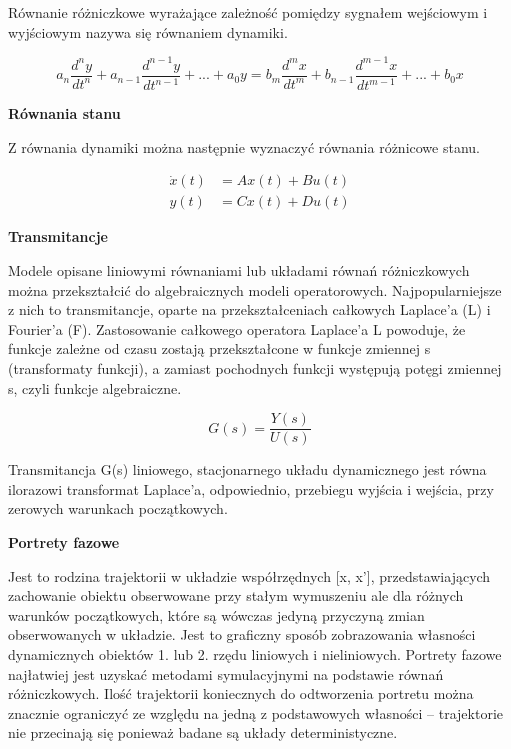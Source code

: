 Równanie różniczkowe wyrażające zależność pomiędzy sygnałem wejściowym i wyjściowym nazywa się równaniem dynamiki.

\begin{equation}
    a_n\frac{d^ny}{dt^n} + a_{n-1}\frac{d^{n-1}y}{dt^{n-1}} + ... + a_0y = b_m\frac{d^mx}{dt^m} + b_{n-1}\frac{d^{m-1}x}{dt^{m-1}} + ... + b_0x
\end{equation}

\textbf{Równania stanu}

Z równania dynamiki można następnie wyznaczyć równania różnicowe stanu.

\begin{equation}
    \begin{split}
    \dot{x}(t) &= Ax(t)+Bu(t)  \\
    y(t) &= Cx(t) + Du(t)
    \end{split}
\end{equation}


\textbf{Transmitancje}

Modele opisane liniowymi równaniami lub układami równań różniczkowych można przekształcić do algebraicznych modeli operatorowych. Najpopularniejsze z nich to transmitancje, oparte na przekształceniach całkowych Laplace’a (L) i Fourier’a (F). Zastosowanie całkowego operatora Laplace’a L powoduje, że funkcje zależne od czasu zostają przekształcone w funkcje zmiennej s (transformaty funkcji), a zamiast pochodnych funkcji występują potęgi zmiennej s, czyli funkcje algebraiczne.


\begin{equation}
    G(s) = \frac{Y(s)}{U(s)}
\end{equation}

Transmitancja G(s) liniowego, stacjonarnego układu dynamicznego jest równa ilorazowi transformat Laplace’a, odpowiednio, przebiegu wyjścia i wejścia, przy zerowych warunkach początkowych.


\textbf{Portrety fazowe}

Jest to rodzina trajektorii w układzie współrzędnych [x, x'], przedstawiających zachowanie obiektu obserwowane przy stałym wymuszeniu ale dla różnych warunków początkowych, które są wówczas jedyną przyczyną zmian obserwowanych w układzie. Jest to graficzny sposób zobrazowania własności dynamicznych obiektów 1. lub 2. rzędu liniowych i nieliniowych. Portrety fazowe najłatwiej jest uzyskać metodami symulacyjnymi na podstawie równań różniczkowych. Ilość trajektorii koniecznych do odtworzenia portretu można znacznie ograniczyć ze względu na jedną z podstawowych własności – trajektorie nie przecinają się ponieważ badane są układy deterministyczne. 

